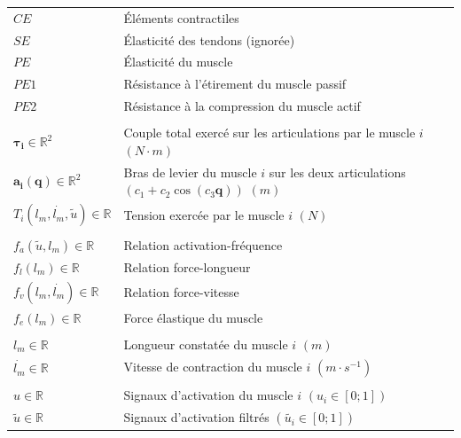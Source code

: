 \documentclass[pdftex,a4paper,11pt]{article}
\newcommand{\vs}[1]{\boldsymbol{#1}} %
\numberwithin{equation}{subsection}
\begin{document}
\begin{tabular}{ll}
    $CE$  & Éléments contractiles \\
    $SE$  & Élasticité des tendons (ignorée) \\
    $PE$  & Élasticité du muscle \\
    $PE1$ & Résistance à l'étirement du muscle passif \\
    $PE2$ & Résistance à la compression du muscle actif \\
    \\

    $\vs{\tau_i} \in \mathbb{R}^2$                   & Couple total exercé sur les articulations par le muscle $i$ $(N \cdot m)$ \\
    $\vs{a_i}(\vs{q}) \in \mathbb{R}^2$              & Bras de levier du muscle $i$ sur les deux articulations $(c_1 + c_2 \cos (c_3 \vs{q}))$ $(m)$ \\
    $T_i(l_m, \dot{l_m}, \tilde{u}) \in \mathbb{R}$  & Tension exercée par le muscle $i$ $(N)$ \\
    \\

    $f_a(\tilde{u}, l_m) \in \mathbb{R}$   & Relation activation-fréquence \\
    $f_l(l_m) \in \mathbb{R}$              & Relation force-longueur \\
    $f_v(l_m, \dot{l_m}) \in \mathbb{R}$   & Relation force-vitesse \\
    $f_e(l_m) \in \mathbb{R}$              & Force élastique du muscle \\ %
    \\

    $l_m \in \mathbb{R}$                   & Longueur constatée du muscle $i$ $(m)$ \\
    $\dot{l_m} \in \mathbb{R}$             & Vitesse de contraction du muscle $i$ $(m \cdot s^{-1})$ \\
    \\

    $u \in \mathbb{R}$                     & Signaux d'activation du muscle $i$ $(u_i \in [0;1])$ \\
    $\tilde{u} \in \mathbb{R}$             & Signaux d'activation filtrés $(\tilde{u_i} \in [0;1])$ \\
\end{tabular}
\end{document}
